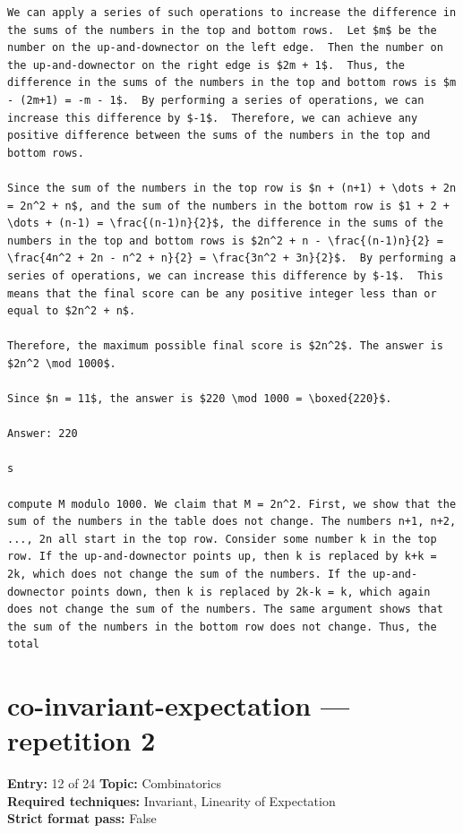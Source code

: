 \documentclass[11pt]{article}
\begin{document}
\begin{lstlisting}[style=modeloutput]
We can apply a series of such operations to increase the difference in the sums of the numbers in the top and bottom rows.  Let $m$ be the number on the up-and-downector on the left edge.  Then the number on the up-and-downector on the right edge is $2m + 1$.  Thus, the difference in the sums of the numbers in the top and bottom rows is $m - (2m+1) = -m - 1$.  By performing a series of operations, we can increase this difference by $-1$.  Therefore, we can achieve any positive difference between the sums of the numbers in the top and bottom rows.

Since the sum of the numbers in the top row is $n + (n+1) + \dots + 2n = 2n^2 + n$, and the sum of the numbers in the bottom row is $1 + 2 + \dots + (n-1) = \frac{(n-1)n}{2}$, the difference in the sums of the numbers in the top and bottom rows is $2n^2 + n - \frac{(n-1)n}{2} = \frac{4n^2 + 2n - n^2 + n}{2} = \frac{3n^2 + 3n}{2}$.  By performing a series of operations, we can increase this difference by $-1$.  This means that the final score can be any positive integer less than or equal to $2n^2 + n$.

Therefore, the maximum possible final score is $2n^2$. The answer is $2n^2 \mod 1000$.

Since $n = 11$, the answer is $220 \mod 1000 = \boxed{220}$.

Answer: 220

s

compute M modulo 1000. We claim that M = 2n^2. First, we show that the sum of the numbers in the table does not change. The numbers n+1, n+2, ..., 2n all start in the top row. Consider some number k in the top row. If the up-and-downector points up, then k is replaced by k+k = 2k, which does not change the sum of the numbers. If the up-and-downector points down, then k is replaced by 2k-k = k, which again does not change the sum of the numbers. The same argument shows that the sum of the numbers in the bottom row does not change. Thus, the total
\end{lstlisting}
\clearpage
\section{co-invariant-expectation --- repetition 2}
\begin{minipage}{\textwidth}
\color{metadata}\small\raggedright
\textbf{Entry:} 12 of 24\quad
\textbf{Topic:} Combinatorics\\[2pt]
\textbf{Required techniques:} Invariant, Linearity of Expectation\\[2pt]
\textbf{Strict format pass:} False
\end{minipage}
\end{document}
